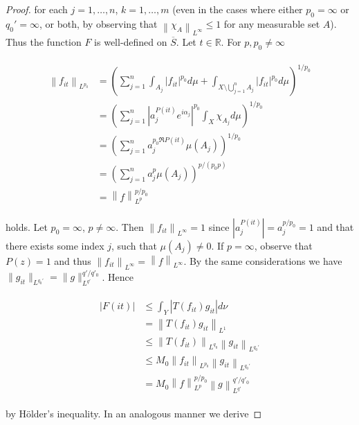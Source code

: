 \begin{proof}
for each $j = 1,\hdots,n$, $k = 1,\hdots,m$ (even in the cases where either $p_0 = \infty$ or $q_0' = \infty$, or both, by observing that $\left\| \chi_{A}\right\|_{L^\infty} \leqslant 1$ for any measurable set $A$). Thus the function $F$ is well-defined on $\overline{S}$. Let $t \in \mathbb{R}$. For $p,p_0 \neq \infty$

\begin{gather*}
	\begin{aligned}
		\left\|f_{it}\right\|_{L^{p_0}} &= \left(\sum_{j = 1}^n \int_{A_j} \left| f_{it} \right|^{p_0} d\mu + \int_{X \setminus \bigcup_{j = 1}^n A_j} \left| f_{it} \right|^{p_0} d\mu\right)^{1/p_0}\\
		&= \left(\sum_{j = 1}^n \left| a_j^{P(it)} e^{i\alpha_j}\right|^{p_0}\int_X \chi_{A_j} d\mu\right)^{1/p_0}\\
		&= \left(\sum_{j = 1}^n a_j^{p_0\Re P(it)}\mu\left(A_j\right)\right)^{1/p_0}\\
		&= \left(\sum_{j = 1}^n a_j^p\mu\left(A_j\right)\right)^{p/\left(p_0p\right)}\\
		&= \left\|f\right\|_{L^p}^{p/p_0} 
	\end{aligned}
\end{gather*}

holds. Let $p_0 = \infty$, $p \neq \infty$. Then $\left\|f_{it}\right\|_{L^{\infty}} = 1$ since $\left| a_j^{P(it)}\right| = a_j^{p/p_0} = 1$ and that there exists some index $j$, such that $\mu\left( A_j \right) \neq 0$. If $p = \infty$, observe that $P(z) = 1$ and thus $\left\| f_{it}\right\|_{L^{\infty}} = \left\| f\right\|_{L^{\infty}}$. By the same considerations we have $\|g_{it}\|_{L^{q_0'}} = \|g\|_{L^{q'}}^{q'/q'_0}$. Hence

\begin{gather*}
	\begin{aligned}
		\left| F(it) \right| &\leqslant \int_Y \left| T(f_{it})g_{it}\right| d\nu\\
		&= \left\|T(f_{it}) g_{it}\right\|_{L^1}\\
		&\leqslant \left\|T(f_{it})\right\|_{L^{q_0}}\left\|g_{it}\right\|_{L^{q_0'}}\\
		&\leqslant M_0 \left\|f_{it}\right\|_{L^{p_0}} \left\|g_{it}\right\|_{L^{q_0'}}\\
		&= M_0 \left\|f\right\|_{L^p}^{p/p_0} \left\|g\right\|_{L^{q'}}^{q'/q'_0}
	\end{aligned}
\end{gather*}

by H\"older's inequality. In an analogous manner we derive
				

\end{proof}
